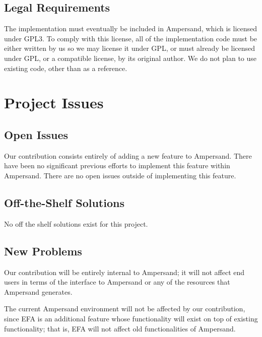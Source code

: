 \documentclass[12pt]{report}
\begin{document}

\section{Legal Requirements}\label{sec:Legal}
The implementation must eventually be included in Ampersand, which is licensed
under GPL3. To comply with this license, all of the implementation code must be
either written by us so we may license it under GPL, or must already be licensed
under GPL, or a compatible license, by its original author. We do not plan to
use existing code, other than as a reference.
%
%

\chapter{Project Issues}\label{ch:issues}
\section{Open Issues}\label{sec:issues}
Our contribution consists entirely of adding a new feature to Ampersand. There
have been no significant previous efforts to implement this feature within
Ampersand. There are no open issues outside of implementing this feature. 
%
\section{Off-the-Shelf Solutions}\label{sec:solutions}
No off the shelf solutions exist for this project.
\section{New Problems}\label{sec:NewProblems}
Our contribution will be entirely internal to Ampersand; it will not affect end
users in terms of the interface to Ampersand or any of the resources that
Ampersand generates. 

The current Ampersand environment will not be affected by our contribution,
since EFA is an additional feature whose functionality will exist on top of
existing functionality; that is, EFA will not affect old functionalities of
Ampersand.
\end{document}
